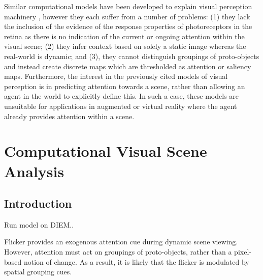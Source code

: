 \documentclass[a4paper,10pt,final]{ThesisStyle}
\begin{document}
Similar computational models have been developed to explain visual perception machinery \cite{Walther2006,Orabona2007a}, however they each suffer from a number of problems: (1) they lack the inclusion of the evidence of the response properties of photoreceptors in the retina as there is no indication of the current or ongoing attention within the visual scene; (2) they infer context based on solely a static image whereas the real-world is dynamic; and (3), they cannot distinguish groupings of proto-objects and instead create discrete maps which are thresholded as attention or saliency maps.  Furthermore, the interest in the previously cited models of visual perception is in predicting attention towards a scene, rather than allowing an agent in the world to explicitly define this.  In such a case, these models are unsuitable for applications in augmented or virtual reality where the agent already provides attention within a scene.  










\chapter{Computational Visual Scene Analysis}
\label{ch:analysis-visual}
\minitoc

\section{Introduction}  

Run model on DIEM..

Flicker provides an exogenous attention cue during dynamic scene viewing.  However, attention must act on groupings of proto-objects, rather than a pixel-based notion of change.  As a result, it is likely that the flicker is modulated by spatial grouping cues.  
\end{document}
